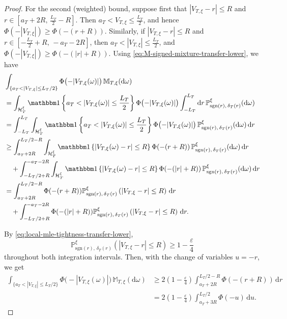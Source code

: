 \documentclass[10pt]{article}
\newcommand{\dd}{\mathrm{d}}
\theoremstyle{plain}
\begin{document}
\begin{proof}
For the second (weighted) bound, suppose first that $|V_{T,\xi}-r|\le R$ and $r\in
    \left[
        a_T+2R,\,
        \frac{L_T}{2}-R
    \right]$.
Then
    $a_T<V_{T,\xi}\le\frac{L_T}{2}$,
and hence
    $\Phi(-|V_{T,\xi}|)
    \ge
    \Phi(-(r+R))$.
Similarly, if $|V_{T,\xi}-r|\le R$ and $r\in
    \left[
        -\frac{L_T}{2}+R,\,
        -a_T-2R
    \right]$,
then
    $a_T<|V_{T,\xi}|\le\frac{L_T}{2}$,
and
    $\Phi(-|V_{T,\xi}|)
    \ge
    \Phi(-(|r|+R))$.
Using \eqref{eq:M-signed-mixture-transfer-lower}, we have
\[
\begin{aligned}
    &\int_{\{a_T<|V_{T,\xi}|\le L_T/2\}}
        \Phi\bigl(-|V_{T,\xi}(\omega)|\bigr)
    \,\mathbb M_{T,\xi}(\dd\omega)\\
    &=
    \int_{\mathcal H^\xi_T}
    \mathbbm 1
        \left\{
            a_T<|V_{T,\xi}(\omega)|
            \le
            \frac{L_T}{2}
        \right\}
        \Phi\bigl(-|V_{T,\xi}(\omega)|\bigr)
    \int_{-L_T}^{L_T}
    \dd r \,\mathbb P_{\mathrm{sgn}(r),\,\delta_T(r)}^\xi(\dd\omega)
    \\
    &=
    \int_{-L_T}^{L_T}
    \int_{\mathcal H^\xi_T}
        \mathbbm 1
        \left\{
            a_T<|V_{T,\xi}(\omega)|
            \le
            \frac{L_T}{2}
        \right\}
        \Phi\bigl(-|V_{T,\xi}(\omega)|\bigr)
    \,\mathbb P_{\mathrm{sgn}(r),\,\delta_T(r)}^\xi(\dd\omega)
    \,\dd r\\
    &\ge
    \int_{a_T+2R}^{L_T/2-R}
    \int_{\mathcal H^\xi_T}
        \mathbbm 1
        \left\{
            |V_{T,\xi}(\omega)-r|\le R
        \right\}
        \Phi(-(r+R))
    \,\mathbb P_{\mathrm{sgn}(r),\,\delta_T(r)}^\xi(\dd\omega)
    \,\dd r\\
    &\quad+
    \int_{-L_T/2+R}^{-a_T-2R}
    \int_{\mathcal H^\xi_T}
        \mathbbm 1
        \left\{
            |V_{T,\xi}(\omega)-r|\le R
        \right\}
        \Phi(-(|r|+R))
    \,\mathbb P_{\mathrm{sgn}(r),\,\delta_T(r)}^\xi(\dd\omega)
    \,\dd r\\
    &=
    \int_{a_T+2R}^{L_T/2-R}
        \Phi(-(r+R))
        \mathbb P_{\mathrm{sgn}(r),\,\delta_T(r)}^\xi
        \left(
            |V_{T,\xi}-r|\le R
        \right)
    \,\dd r\\
    &\quad+
    \int_{-L_T/2+R}^{-a_T-2R}
        \Phi(-(|r|+R))
        \mathbb P_{\mathrm{sgn}(r),\,\delta_T(r)}^\xi
        \left(
            |V_{T,\xi}-r|\le R
        \right)
    \,\dd r.
\end{aligned}
\]

By \eqref{eq:local-mle-tightness-transfer-lower},
\[
    \mathbb P_{\mathrm{sgn}(r),\,\delta_T(r)}^\xi
    \left(
        |V_{T,\xi}-r|\le R
    \right)
    \ge
    1-\frac{\varepsilon}{4}
\]
throughout both integration intervals. Then, with
the change of variables \(u=-r\), we get
\[
\begin{aligned}
    \int_{\{a_T<|V_{T,\xi}|\le L_T/2\}}
        \Phi\bigl(-|V_{T,\xi}(\omega)|\bigr)
    \,\mathbb M_{T,\xi}(\dd\omega)
    &\ge
    2\left(1-\frac{\varepsilon}{4}\right)
    \int_{a_T+2R}^{L_T/2-R}
        \Phi(-(r+R))
    \,\dd r\\
    &=
    2\left(1-\frac{\varepsilon}{4}\right)
    \int_{a_T+3R}^{L_T/2}
        \Phi(-u)
    \,\dd u.
\end{aligned}
\]


\end{proof}
\end{document}

